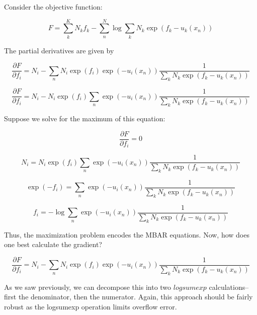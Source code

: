 \documentclass[12pt]{article}
\begin{document}
Consider the objective function:

$$F = \sum_k^K N_k f_k - \sum_n^N \log \sum_k N_k \exp(f_k - u_k(x_n))$$

The partial derivatives are given by 

$$\frac{\partial F}{\partial f_i} = N_i - \sum_n N_i \exp(f_i) \exp(-u_i(x_n)) \frac{1}{\sum_k N_k \exp(f_k - u_k(x_n))}$$

$$\frac{\partial F}{\partial f_i} = N_i - N_i \exp(f_i) \sum_n \exp(-u_i(x_n)) \frac{1}{\sum_k N_k \exp(f_k - u_k(x_n))}$$

Suppose we solve for the maximum of this equation:

$$\frac{\partial F}{\partial f_i} = 0$$

$$N_i = N_i \exp(f_i) \sum_n \exp(-u_i(x_n)) \frac{1}{\sum_k N_k \exp(f_k - u_k(x_n))}$$

$$\exp(-f_i) = \sum_n \exp(-u_i(x_n)) \frac{1}{\sum_k N_k \exp(f_k - u_k(x_n))}$$

$$f_i = -\log \sum_n \exp(-u_i(x_n)) \frac{1}{\sum_k N_k \exp(f_k - u_k(x_n))}$$

Thus, the maximization problem encodes the MBAR equations.  Now, how does one best calculate the gradient?

$$\frac{\partial F}{\partial f_i} = N_i - \sum_n N_i \exp(f_i) \exp(-u_i(x_n)) \frac{1}{\sum_k N_k \exp(f_k - u_k(x_n))}$$

As we saw previously, we can decompose this into two $logsumexp$ calculations--first the denominator, then the numerator.  Again, this approach should be fairly robust as the logsumexp operation limits overflow error.
\end{document}
